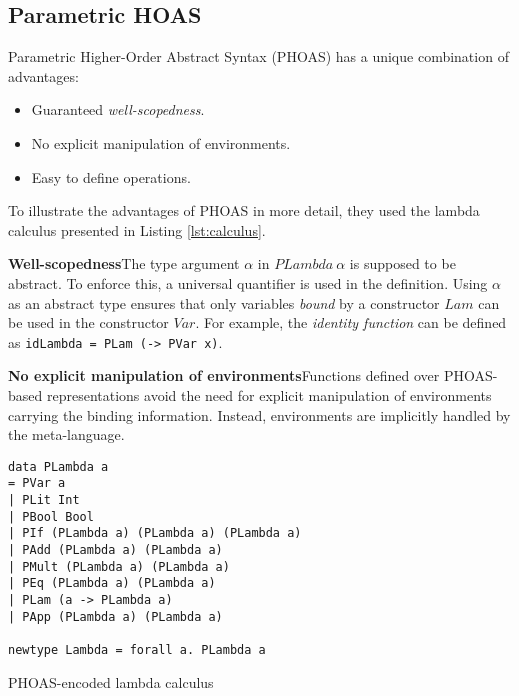 \subsection{Parametric HOAS}\label{subsec:phoas}

Parametric Higher-Order Abstract Syntax (PHOAS) has a unique combination of advantages:

\begin{itemize}
  \item Guaranteed \emph{well-scopedness}.
  \item No explicit manipulation of environments.
  \item Easy to define operations.
\end{itemize}

To illustrate the advantages of PHOAS in more detail, they used the lambda calculus presented in Listing \ref{lst:calculus}.

\textbf{Well-scopedness}\quad The type argument $\alpha$ in $PLambda \ \alpha$ is supposed to be abstract. To enforce this, a universal quantifier is used in the definition. Using $\alpha$ as an abstract type ensures that only variables \emph{bound} by a constructor $Lam$ can be used in the constructor $Var$. For example, the \emph{identity function} can be defined as \texttt{idLambda = PLam (\x -> PVar x)}.

\textbf{No explicit manipulation of environments}\quad Functions defined over PHOAS-based representations avoid the need for explicit manipulation of environments carrying the binding information. Instead, environments are implicitly handled by the meta-language. %

\begin{listing}[H]
\begin{verbatim}
data PLambda a
= PVar a
| PLit Int
| PBool Bool
| PIf (PLambda a) (PLambda a) (PLambda a)
| PAdd (PLambda a) (PLambda a)
| PMult (PLambda a) (PLambda a)
| PEq (PLambda a) (PLambda a)
| PLam (a -> PLambda a)
| PApp (PLambda a) (PLambda a)

newtype Lambda = forall a. PLambda a
\end{verbatim}
\caption{PHOAS-encoded lambda calculus}
\label{lst:calculus}
\end{listing}



